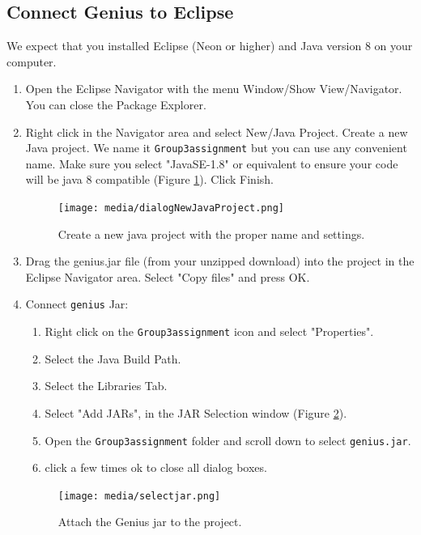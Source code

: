 \documentclass[]{article}
\newcommand\Genius{{\sc Genius}}
\begin{document}
\subsection{Connect Genius to Eclipse}
\label{sec:appendix-run-genius}
We expect that you installed Eclipse (Neon or higher) and Java version 8 on your computer.
\begin{enumerate}

\item Open the Eclipse Navigator with the menu Window/Show View/Navigator. You can close the Package Explorer.

\item Right click in the Navigator area and select New/Java Project. Create a new Java project. We name it \texttt{Group3assignment} but you can use any convenient name. Make sure you select "JavaSE-1.8" or equivalent to ensure your code will be java 8 compatible (Figure \ref{fig:run-genius-1}). Click Finish.

\begin{figure}[h!]
	\centering
		\texttt{[image: media/dialogNewJavaProject.png]}
		\caption{Create a new java project with the proper name and settings.}
	\label{fig:run-genius-1}
\end{figure}

\item Drag the genius.jar file (from your unzipped download) into the project in the Eclipse Navigator area. Select "Copy files" and press OK.

\FloatBarrier

\item{Connect \texttt{genius} Jar:
	\begin{enumerate}
		\item Right click on the \texttt{Group3assignment} icon and select "Properties".
		\item Select the Java Build Path.
		\item Select the Libraries Tab.
		\item Select "Add JARs", in the JAR Selection window (Figure \ref{fig:run-genius-3}).
		\item Open the \texttt{Group3assignment} folder and scroll down to select \texttt{genius.jar}.
		\item click a few times ok to close all dialog boxes.
	\end{enumerate}
	}
	
\begin{figure}[h!]
	\centering
		\texttt{[image: media/selectjar.png]}
		\caption{Attach the {\Genius} jar to the project.}
	\label{fig:run-genius-3}
\end{figure}



\end{enumerate}
\end{document}
